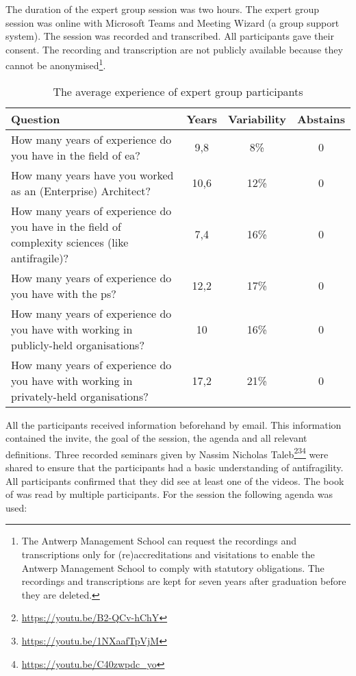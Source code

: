 The duration of the expert group session was two hours. The expert group session was online with Microsoft Teams and Meeting Wizard (a group support system). The session was recorded and transcribed. All participants gave their consent. The recording and transcription are not publicly available because they cannot be anonymised\footnote{The Antwerp Management School can request the recordings and transcriptions only for (re)accreditations and visitations to enable the Antwerp Management School to comply with statutory obligations. The recordings and transcriptions are kept for seven years after graduation before they are deleted.}.
\begin{longtable}{@{}p{}ccc@{}}
	\toprule%
	\textbf{Question} & \textbf{Years} & \textbf{Variability} & \textbf{Abstains} \\
	\midrule%
	\endhead%
	\hline
	\endfoot%
	\caption[The average experience of expert group participants]{The average experience of expert group participants}
	\label{tab:experiencevalidationgroup}%
	\endlastfoot%
	How many years of experience do you have in the field of \acrlong{ea}? & 9,8 & 8\% & 0 \\%
	How many years have you worked as an (Enterprise) Architect? & 10,6 & 12\% & 0 \\%
	How many years of experience do you have in the field of complexity sciences (like \gls{antifragile})? & 7,4 & 16\% & 0 \\%
	How many years of experience do you have with the \gls{ps}? & 12,2 & 17\% & 0 \\%
	How many years of experience do you have with working in publicly-held organisations? & 10 & 16\% & 0 \\%
	How many years of experience do you have with working in privately-held organisations? & 17,2 & 21\% & 0 \\%
	\bottomrule%
\end{longtable}
All the participants received information beforehand by email. This information contained the invite, the goal of the session, the agenda and all relevant definitions. Three recorded seminars given by Nassim Nicholas Taleb\footnote{\url{https://youtu.be/B2-QCv-hChY}}\footnote{\url{https://youtu.be/1NXaafTpVjM}}\footnote{\url{https://youtu.be/C40zwpdc_yo}} were shared to ensure that the participants had a basic understanding of \gls{antifragility}. All participants confirmed that they did see at least one of the videos. The book of \textcite{Taleb2012} was read by multiple participants. For the session the following agenda was used:

